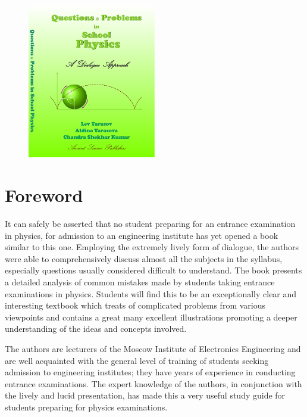 \begin{figure}
  \begin{center}
    \includegraphics[width=0.5\textwidth]{tarasov-phy/cover}
  \end{center}
\end{figure}

\section{Foreword}

\hspace{5mm}It can safely be asserted that no student preparing for an entrance examination in physics, for admission to an engineering institute has yet opened a book similar to this one. Employing the extremely lively form of dialogue, the authors were able to comprehensively discuss almost all the subjects in the syllabus, especially questions usually considered difficult to understand. The book presents a detailed analysis of common mistakes made by students taking entrance examinations in physics. Students will find this to be an exceptionally clear and interesting textbook which treats of complicated problems from various viewpoints and contains a great many excellent illustrations promoting a deeper understanding of the ideas and concepts involved. 

\vspace{2mm}

The authors are lecturers of the Moscow Institute of Electronics Engineering and are well acquainted with the general level of training of students seeking admission to engineering institutes; they have years of experience in conducting entrance examinations. The expert knowledge of the authors, in conjunction with the lively and lucid presentation, has made this a very useful study guide for students preparing for physics examinations. 


